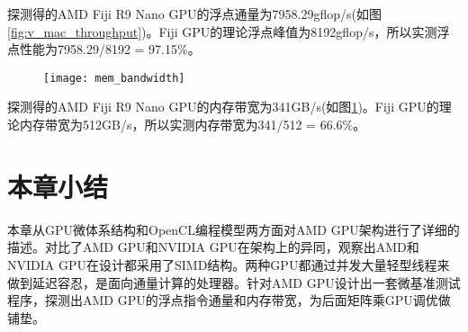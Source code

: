 探测得的AMD Fiji R9 Nano GPU的浮点通量为7958.29gflop/s(如图\ref{fig:v_mac_throughput})。Fiji GPU的理论浮点峰值为8192gflop/s，所以实测浮点性能为7958.29/8192 = 97.15\%。

\begin{figure}[htbp]
	\centering
	\texttt{[image: mem\_bandwidth]}
	\label{fig:mem_bandwidth}
\end{figure}

探测得的AMD Fiji R9 Nano GPU的内存带宽为341GB/s(如图\ref{fig:mem_bandwidth})。Fiji GPU的理论内存带宽为512GB/s，所以实测内存带宽为341/512 = 66.6\%。

\section{本章小结}
本章从GPU微体系结构和OpenCL编程模型两方面对AMD GPU架构进行了详细的描述。对比了AMD GPU和NVIDIA GPU在架构上的异同，观察出AMD和NVIDIA GPU在设计都采用了SIMD结构。两种GPU都通过并发大量轻型线程来做到延迟容忍，是面向通量计算的处理器。针对AMD GPU设计出一套微基准测试程序，探测出AMD GPU的浮点指令通量和内存带宽，为后面矩阵乘GPU调优做铺垫。


